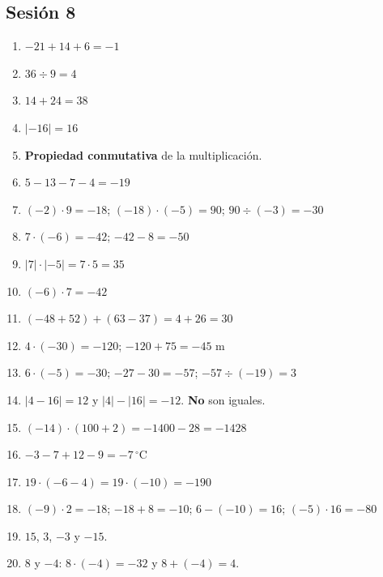 \documentclass[12pt, letterpaper]{article}
\begin{document}
\subsection*{Sesión 8}
\begin{enumerate}[leftmargin=*, label=\textbf{\arabic*.}]
  \item $-21 + 14 + 6 = -1$
  \item $36 \div 9 = 4$
  \item $14 + 24 = 38$
  \item $|-16| = 16$
  \item \textbf{Propiedad conmutativa} de la multiplicación.
  \item $5 - 13 - 7 - 4 = -19$
  \item $(-2) \cdot 9 = -18$; $(-18) \cdot (-5) = 90$; $90 \div (-3) = -30$
  \item $7 \cdot (-6) = -42$; $-42 - 8 = -50$
  \item $|7| \cdot |-5| = 7 \cdot 5 = 35$
  \item $(-6) \cdot 7 = -42$
  \item $(-48 + 52) + (63 - 37) = 4 + 26 = 30$
  \item $4 \cdot (-30) = -120$; $-120 + 75 = -45$ m
  \item $6 \cdot (-5) = -30$; $-27 - 30 = -57$; $-57 \div (-19) = 3$
  \item $|4 - 16| = 12$ y $|4| - |16| = -12$. \textbf{No} son iguales.
  \item $(-14) \cdot (100 + 2) = -1400 - 28 = -1428$
  \item $-3 - 7 + 12 - 9 = -7\,^{\circ}$C
  \item $19 \cdot (-6 - 4) = 19 \cdot (-10) = -190$
  \item $(-9) \cdot 2 = -18$; $-18 + 8 = -10$; $6 - (-10) = 16$; $(-5) \cdot 16 = -80$
  \item $15$, $3$, $-3$ y $-15$.
  \item $8$ y $-4$: $8 \cdot (-4) = -32$ y $8 + (-4) = 4$.
\end{enumerate}
\end{document}
